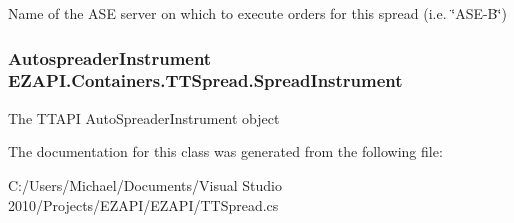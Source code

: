 Name of the A\-S\-E server on which to execute orders for this spread (i.\-e. \char`\"{}\-A\-S\-E-\/\-B\char`\"{}) 

\hypertarget{class_e_z_a_p_i_1_1_containers_1_1_t_t_spread_a7bbb6d6647e867a3ae59748ede381201}{
\subsubsection[{Spread\-Instrument}]{\setlength{\rightskip}{0pt plus 5cm}Autospreader\-Instrument E\-Z\-A\-P\-I.\-Containers.\-T\-T\-Spread.\-Spread\-Instrument\hspace{0.3cm}{\ttfamily [get]}}}\label{class_e_z_a_p_i_1_1_containers_1_1_t_t_spread_a7bbb6d6647e867a3ae59748ede381201}


The T\-T\-A\-P\-I Auto\-Spreader\-Instrument object 



The documentation for this class was generated from the following file\-:\begin{DoxyCompactItemize}
\item 
C\-:/\-Users/\-Michael/\-Documents/\-Visual Studio 2010/\-Projects/\-E\-Z\-A\-P\-I/\-E\-Z\-A\-P\-I/T\-T\-Spread.\-cs\end{DoxyCompactItemize}
